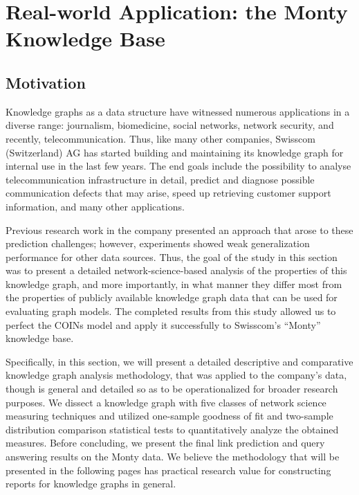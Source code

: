 \section{Real-world Application: the Monty Knowledge Base}
\label{sec: swisscom}

\subsection{Motivation}

Knowledge graphs as a data structure have witnessed numerous applications in a diverse range: journalism, biomedicine, social networks, network security, and recently, telecommunication. Thus, like many other companies, Swisscom (Switzerland) AG has started building and maintaining its knowledge graph for internal use in the last few years. The end goals include the possibility to analyse telecommunication infrastructure in detail, predict and diagnose possible communication defects that may arise, speed up retrieving customer support information, and many other applications.

Previous research work in the company presented an approach that arose to these prediction challenges; however, experiments showed weak generalization performance for other data sources. Thus, the goal of the study in this section was to present a detailed network-science-based analysis of the properties of this knowledge graph, and more importantly, in what manner they differ most from the properties of publicly available knowledge graph data that can be used for evaluating graph models. The completed results from this study allowed us to perfect the COINs model and apply it successfully to Swisscom's \enquote{Monty} knowledge base. 

Specifically, in this section, we will present a detailed descriptive and comparative knowledge graph analysis methodology, that was applied to the company's data, though is general and detailed so as to be operationalized for broader research purposes. We dissect a knowledge graph with five classes of network science measuring techniques and utilized one-sample goodness of fit and two-sample distribution comparison statistical tests to quantitatively analyze the obtained measures. Before concluding, we present the final link prediction and query answering results on the Monty data. We believe the methodology that will be presented in the following pages has practical research value for constructing reports for knowledge graphs in general. 

